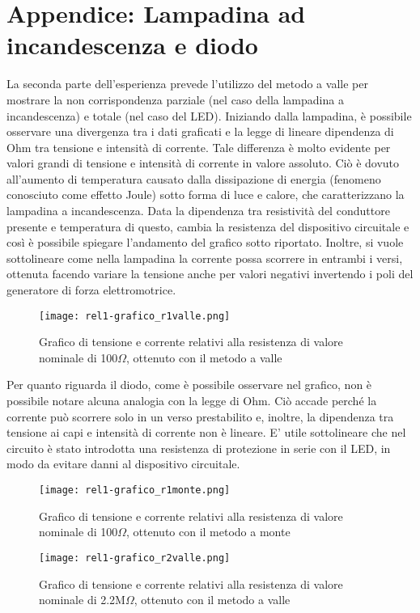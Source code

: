 \documentclass{article}
\begin{document}
\section{Appendice: Lampadina ad incandescenza e
diodo}
La seconda parte dell’esperienza prevede l’utilizzo del metodo a valle per mostrare la non corrispondenza parziale (nel caso della lampadina a incandescenza) e totale (nel caso del LED). Iniziando dalla lampadina, è possibile osservare una divergenza tra i dati graficati e la legge di lineare dipendenza di Ohm tra tensione
e intensità di corrente. Tale differenza è molto evidente per valori grandi
di tensione e intensità di corrente in valore assoluto. Ciò è dovuto all’aumento
di temperatura causato dalla dissipazione di energia (fenomeno conosciuto come
effetto Joule) sotto forma di luce e calore, che caratterizzano la lampadina
a incandescenza. Data la dipendenza tra resistività del conduttore presente e
temperatura di questo, cambia la resistenza del dispositivo circuitale e così è
possibile spiegare l’andamento del grafico sotto riportato. Inoltre, si vuole sottolineare come nella lampadina la corrente possa scorrere in entrambi i versi,
ottenuta facendo variare la tensione anche per valori negativi invertendo i poli del generatore di forza elettromotrice.\\
\begin{figure}
    \centering
    \texttt{[image: rel1-grafico\_r1valle.png]}
    \caption{Grafico di tensione e corrente relativi alla resistenza di valore nominale
di 100$\Omega$, ottenuto con il metodo a valle}
    \label{figura5}
\end{figure}
Per quanto riguarda il diodo, come è possibile osservare nel grafico, non è
possibile notare alcuna analogia con la legge di Ohm. Ciò accade perché la
corrente può scorrere solo in un verso prestabilito e, inoltre, la dipendenza tra
tensione ai capi e intensità di corrente non è lineare. E' utile sottolineare che
nel circuito è stato introdotta una resistenza di protezione in serie con il LED,
in modo da evitare danni al dispositivo circuitale.
\begin{figure}
    \centering
    \texttt{[image: rel1-grafico\_r1monte.png]}
    \caption{Grafico di tensione e corrente relativi alla resistenza di valore nominale
di 100$\Omega$, ottenuto con il metodo a monte}
    \label{figura6}
\end{figure}
\begin{figure}
    \centering
    \texttt{[image: rel1-grafico\_r2valle.png]}
    \caption{Grafico di tensione e corrente relativi alla resistenza di valore nominale
di 2.2M$\Omega$, ottenuto con il metodo a valle}
    \label{figura7}
\end{figure}
\end{document}
